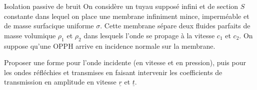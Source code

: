 \begin{exo}[PC][1][TD]{Isolation passive de bruit}
On considère un tuyau supposé infini et de section $S$ constante dans lequel on place une membrane infiniment mince, imperméable et de masse surfacique uniforme $\sigma$. Cette membrane sépare deux fluides parfaits de masse volumique $\rho_1$ et $\rho_2$ dans lesquels l'onde se propage à la vitesse $c_1$ et $c_2$. On suppose qu'une OPPH arrive en incidence normale sur la membrane.
\begin{quest}
\item Proposer une forme pour l'onde incidente (en vitesse et en pression), puis pour les ondes réfléchies et transmises en faisant intervenir les coefficients de transmission en amplitude en vitesse $\underline{r}$ et $\underline{t}$.
\sol{
    Dans le milieu incident l'onde incidente se superpose avec l'onde réfléchie donc
    $$
\begin{cases}
\underline{v_1}=\underline{A_{\rm{i}}}\e^{i(\omega t-kx)} + \underline{A_{\rm{r}}}\e^{i(\omega t+kx)},\\
\underline{p_1}=Z\underline{A_{\rm{i}}}\e^{i(\omega t-kx)} \JRouge{-}Z \underline{A_{\rm{r}}}\e^{i(\omega t+kx)},
\end{cases}
$$
avec $Z=\rho_1 c_1$,
et dans le milieu où l'onde est transmise
    $$
\begin{cases}
\underline{v_1}'=\underline{A_{\rm{t}}}\e^{i(\omega t-k'x)},\\
\underline{p_1}'=Z'\underline{A_{\rm{t}}}\e^{i(\omega t-k'x)},
\end{cases}
$$
avec $Z' = \rho_2 c_2$.
Par définition on a $\underline{r}=\frac{\underline{A_{\rm{r}}}}{\underline{A_{\rm{i}}}}$ et $\underline{t}=\frac{\underline{A_{\rm{t}}}}{\underline{A_{\rm{i}}}}$, soit 
    $$
        \begin{cases}
            \underline{v_1}=\underline{A_{\rm{i}}}\left( \e^{i(\omega t-kx)} + \udl{r} \e^{i(\omega t+kx)} \right),\\
            \underline{p_1}=Z\underline{A_{\rm{i}}}\left(\, \e^{i(\omega t-kx)} \udl{r} \e^{i(\omega t+kx)}\right),

\end{cases}$$}
\end{quest}
\end{exo}
